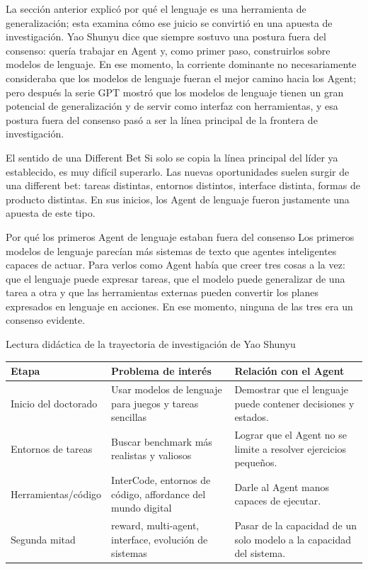 \documentclass[a4paper]{article}
\begin{document}
La sección anterior explicó por qué el lenguaje es una herramienta de generalización; esta examina cómo ese juicio se convirtió en una apuesta de investigación. Yao Shunyu dice que siempre sostuvo una postura fuera del consenso: quería trabajar en Agent y, como primer paso, construirlos sobre modelos de lenguaje. En ese momento, la corriente dominante no necesariamente consideraba que los modelos de lenguaje fueran el mejor camino hacia los Agent; pero después la serie GPT mostró que los modelos de lenguaje tienen un gran potencial de generalización y de servir como interfaz con herramientas, y esa postura fuera del consenso pasó a ser la línea principal de la frontera de investigación.

\begin{importantbox}{El sentido de una Different Bet}
Si solo se copia la línea principal del líder ya establecido, es muy difícil superarlo. Las nuevas oportunidades suelen surgir de una different bet: tareas distintas, entornos distintos, interface distinta, formas de producto distintas. En sus inicios, los Agent de lenguaje fueron justamente una apuesta de este tipo.
\end{importantbox}

\begin{knowledgebox}{Por qué los primeros Agent de lenguaje estaban fuera del consenso}
Los primeros modelos de lenguaje parecían más sistemas de texto que agentes inteligentes capaces de actuar. Para verlos como Agent había que creer tres cosas a la vez: que el lenguaje puede expresar tareas, que el modelo puede generalizar de una tarea a otra y que las herramientas externas pueden convertir los planes expresados en lenguaje en acciones. En ese momento, ninguna de las tres era un consenso evidente.
\end{knowledgebox}

\begin{knowledgebox}{Lectura didáctica de la trayectoria de investigación de Yao Shunyu}
\begin{tabularx}{\textwidth}{p{}p{}X}
\toprule
Etapa & Problema de interés & Relación con el Agent \\
\midrule
Inicio del doctorado & Usar modelos de lenguaje para juegos y tareas sencillas & Demostrar que el lenguaje puede contener decisiones y estados. \\
Entornos de tareas & Buscar benchmark más realistas y valiosos & Lograr que el Agent no se limite a resolver ejercicios pequeños. \\
Herramientas/código & InterCode, entornos de código, affordance del mundo digital & Darle al Agent manos capaces de ejecutar. \\
Segunda mitad & reward, multi-agent, interface, evolución de sistemas & Pasar de la capacidad de un solo modelo a la capacidad del sistema. \\
\bottomrule
\end{tabularx}
\end{knowledgebox}
\end{document}
